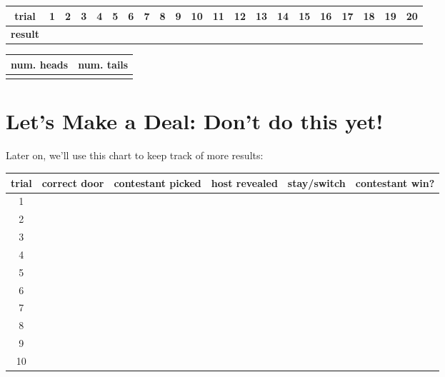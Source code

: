 \documentclass[a4paper]{article}
\begin{document}
 \noindent \begin{center}\begin{tabular}{c|c|c|c|c|c|c|c|c|c|c|c|c|c|c|c|c|c|c|c|c|}
    \textbf{trial} & 1 & 2 & 3 & 4& 5 & 6 & 7 & 8 & 9 & 10 & 11 & 12 & 13 & 14 & 15 & 16 & 17 & 18 & 19 & 20 \\ \hline
    \textbf{result} &&&&&&&&&&&&&&&&&&&&&
 \end{tabular} \vspace{5mm}
 
 \begin{tabular}{c|c}
     num. heads & num. tails \\ \hline
      & 
 \end{tabular}\end{center}
 
\section{Let's Make a Deal: Don't do this yet!}
Later on, we'll use this chart to keep track of more results: \vspace{5mm}

\begin{tabular}{c||c|c|c|c|c}
    trial & correct door & contestant picked & host revealed & stay/switch & contestant win? \\ \hline \hline
    1 & & & & \\ \hline
    2 & & & & \\ \hline
    3 & & & & \\ \hline
    4 & & & & \\ \hline
    5 & & & & \\ \hline
    6 & & & & \\ \hline
    7 & & & & \\ \hline
    8 & & & & \\ \hline
    9 & & & & \\ \hline
    10 & & & & \\ \hline
\end{tabular}
\end{document}
